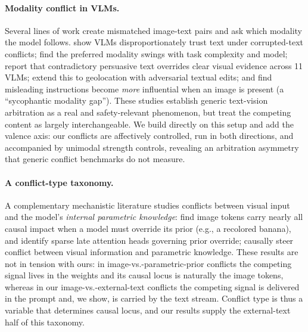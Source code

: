 \documentclass{article}
\begin{document}
\paragraph{Modality conflict in VLMs.}
Several lines of work create mismatched image-text pairs and ask which modality the model follows. \citet{deng2025blindfaith} show VLMs disproportionately trust text under corrupted-text conflicts; \citet{mixedsignals2025} find the preferred modality swings with task complexity and model; \citet{contextvqa2026} report that contradictory persuasive text overrides clear visual evidence across 11 VLMs; \citet{signpost2026} extend this to geolocation with adversarial textual edits; and \citet{camel2025} find misleading instructions become \emph{more} influential when an image is present (a ``sycophantic modality gap''). These studies establish generic text-vision arbitration as a real and safety-relevant phenomenon, but treat the competing content as largely interchangeable. We build directly on this setup and add the valence axis: our conflicts are affectively controlled, run in both directions, and accompanied by unimodal strength controls, revealing an arbitration asymmetry that generic conflict benchmarks do not measure.

\paragraph{A conflict-type taxonomy.}
A complementary mechanistic literature studies conflicts between visual input and the model's \emph{internal parametric knowledge}: \citet{nooralahzadeh2026} find image tokens carry nearly all causal impact when a model must override its prior (e.g., a recolored banana), and \citet{lietzow2026} identify sparse late attention heads governing prior override; \citet{seeingoverrides2026} causally steer conflict between visual information and parametric knowledge. These results are not in tension with ours: in image-vs.-parametric-prior conflicts the competing signal lives in the weights and its causal locus is naturally the image tokens, whereas in our image-vs.-external-text conflicts the competing signal is delivered in the prompt and, we show, is carried by the text stream. Conflict type is thus a variable that determines causal locus, and our results supply the external-text half of this taxonomy.
\end{document}
